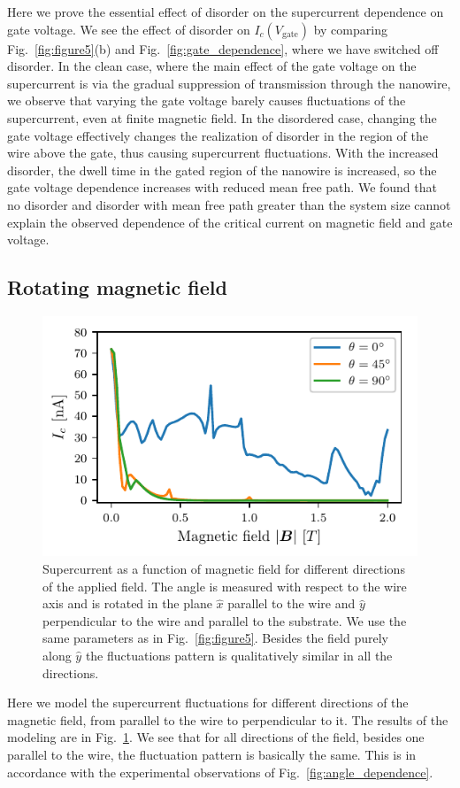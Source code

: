 Here we prove the essential effect of disorder on the supercurrent dependence on gate voltage.
We see the effect of disorder on $I_c(V_\textrm{gate})$ by comparing Fig.~\ref{fig:figure5}(b) and Fig.~\ref{fig:gate_dependence}, where we have switched off disorder.
In the clean case, where the main effect of the gate voltage on the supercurrent is via the gradual suppression of transmission through the nanowire, we observe that varying the gate voltage barely causes fluctuations of the supercurrent, even at finite magnetic field.
In the disordered case, changing the gate voltage effectively changes the realization of disorder in the region of the wire above the gate, thus causing supercurrent fluctuations.
With the increased disorder, the dwell time in the gated region of the nanowire is increased, so the gate voltage dependence increases with reduced mean free path.
We found that no disorder and disorder with mean free path greater than the system size cannot explain the observed dependence of the critical current on magnetic field and gate voltage.

\subsection{Rotating magnetic field}
\begin{figure}
\begin{center}
\includegraphics[width=0.7\columnwidth]{chapter_supercurrent/figures/sup_fig10}
\caption{
Supercurrent as a function of magnetic field for different directions of the applied field.
The angle is measured with respect to the wire axis and is rotated in the plane $\hat{x}$ parallel to the wire and $\hat{y}$ perpendicular to the wire and parallel to the substrate.
We use the same parameters as in Fig.~\ref{fig:figure5}.
Besides the field purely along $\hat{y}$ the fluctuations pattern is qualitatively similar in all the directions.}
\label{fig:rotation_of_field}
\end{center}
\end{figure}

Here we model the supercurrent fluctuations for different directions of the magnetic field, from parallel to the wire to perpendicular to it.
The results of the modeling are in Fig.~\ref{fig:rotation_of_field}.
We see that for all directions of the field, besides one parallel to the wire, the fluctuation pattern is basically the same.
This is in accordance with the experimental observations of Fig.~\ref{fig:angle_dependence}.

